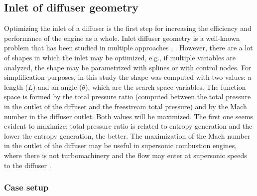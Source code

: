 \newpage

\subsection{Inlet of diffuser geometry}

Optimizing the inlet of a diffuser is the first step for increasing the efficiency and performance of the engine as a whole. Inlet diffuser geometry is a well-known problem that has been studied in multiple approaches \cite{djebedjian2004two}, \cite{schmandt2011diffuser}. However, there are a lot of shapes in which the inlet may be optimized, e.g., if multiple variables are analyzed, the shape may be parametrized with splines or with control nodes. For simplification purposes, in this study the shape was computed with two values: a length ($L$) and an angle ($\theta$), which are the search space variables. The function space is formed by the total pressure ratio (computed between the total pressure in the outlet of the diffuser and the freestream total pressure) and by the Mach number in the diffuser outlet. Both values will be maximized. The first one seems evident to maximize: total pressure ratio is related to entropy generation and the lower the entropy generation, the better. The maximization of the Mach number in the outlet of the diffuser may be useful in supersonic combustion engines, where there is not turbomachinery and the flow may enter at supersonic speeds to the diffuser \cite{cain2002review}. 

\subsubsection*{Case setup}

